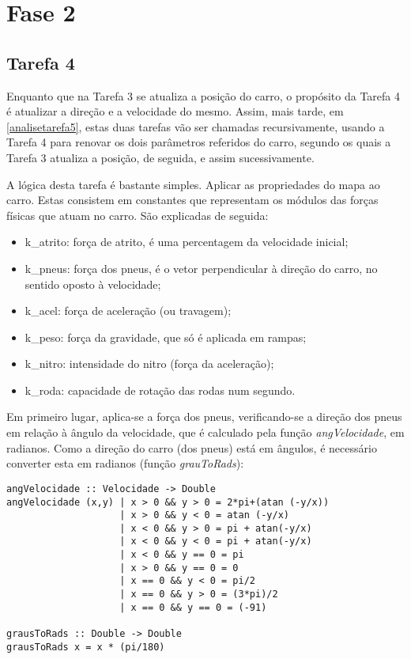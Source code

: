 \documentclass[a4paper]{report}
\begin{document}
\section{Fase 2}

\subsection{Tarefa 4}
\label{solucaotarefa4}

Enquanto que na Tarefa 3 se atualiza a posição do carro, o propósito da Tarefa 4 é atualizar a direção e a velocidade do mesmo. Assim, mais tarde, em \ref{analisetarefa5}, estas duas tarefas vão ser chamadas recursivamente, usando a Tarefa 4 para renovar os dois parâmetros referidos do carro, segundo os quais a Tarefa 3 atualiza a posição, de seguida, e assim sucessivamente.

A lógica desta tarefa é bastante simples. Aplicar as propriedades do mapa ao carro. Estas consistem em constantes que representam os módulos das forças físicas que atuam no carro. São explicadas de seguida:

\begin{itemize}
    \item k\_atrito: força de atrito, é uma percentagem da velocidade inicial;
    \item k\_pneus: força dos pneus, é o vetor perpendicular à direção do carro, no sentido oposto à velocidade;
    \item k\_acel: força de aceleração (ou travagem);
    \item k\_peso: força da gravidade, que só é aplicada em rampas;
    \item k\_nitro: intensidade do nitro (força da aceleração);
    \item k\_roda: capacidade de rotação das rodas num segundo.
\end{itemize}

Em primeiro lugar, aplica-se a força dos pneus, verificando-se a direção dos pneus em relação à ângulo da velocidade, que é calculado pela função \textit{angVelocidade}, em radianos. Como a direção do carro (dos pneus) está em ângulos, é necessário converter esta em radianos (função \textit{grauToRads}):

\begin{verbatim}
angVelocidade :: Velocidade -> Double
angVelocidade (x,y) | x > 0 && y > 0 = 2*pi+(atan (-y/x))
                    | x > 0 && y < 0 = atan (-y/x)
                    | x < 0 && y > 0 = pi + atan(-y/x)
                    | x < 0 && y < 0 = pi + atan(-y/x)
                    | x < 0 && y == 0 = pi
                    | x > 0 && y == 0 = 0
                    | x == 0 && y < 0 = pi/2
                    | x == 0 && y > 0 = (3*pi)/2
                    | x == 0 && y == 0 = (-91)
                    
grausToRads :: Double -> Double
grausToRads x = x * (pi/180)
\end{verbatim}
\end{document}
